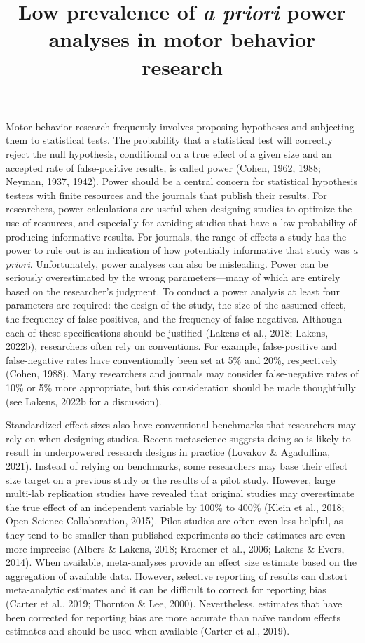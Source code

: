 \documentclass[
  doc, donotrepeattitle,floatsintext]{apa7}
\title{Low prevalence of \emph{a priori} power analyses in motor behavior research}
\author{\phantom{0}}
\date{}
\affiliation{\phantom{0}}
\begin{document}
\maketitle

Motor behavior research frequently involves proposing hypotheses and subjecting them to statistical tests. The probability that a statistical test will correctly reject the null hypothesis, conditional on a true effect of a given size and an accepted rate of false-positive results, is called power (Cohen, 1962, 1988; Neyman, 1937, 1942). Power should be a central concern for statistical hypothesis testers with finite resources and the journals that publish their results. For researchers, power calculations are useful when designing studies to optimize the use of resources, and especially for avoiding studies that have a low probability of producing informative results. For journals, the range of effects a study has the power to rule out is an indication of how potentially informative that study was \emph{a priori}. Unfortunately, power analyses can also be misleading. Power can be seriously overestimated by the wrong parameters---many of which are entirely based on the researcher's judgment. To conduct a power analysis at least four parameters are required: the design of the study, the size of the assumed effect, the frequency of false-positives, and the frequency of false-negatives. Although each of these specifications should be justified (Lakens et al., 2018; Lakens, 2022b), researchers often rely on conventions. For example, false-positive and false-negative rates have conventionally been set at 5\% and 20\%, respectively (Cohen, 1988). Many researchers and journals may consider false-negative rates of 10\% or 5\% more appropriate, but this consideration should be made thoughtfully (see Lakens, 2022b for a discussion).

Standardized effect sizes also have conventional benchmarks that researchers may rely on when designing studies. Recent metascience suggests doing so is likely to result in underpowered research designs in practice (Lovakov \& Agadullina, 2021). Instead of relying on benchmarks, some researchers may base their effect size target on a previous study or the results of a pilot study. However, large multi-lab replication studies have revealed that original studies may overestimate the true effect of an independent variable by 100\% to 400\% (Klein et al., 2018; Open Science Collaboration, 2015). Pilot studies are often even less helpful, as they tend to be smaller than published experiments so their estimates are even more imprecise (Albers \& Lakens, 2018; Kraemer et al., 2006; Lakens \& Evers, 2014). When available, meta-analyses provide an effect size estimate based on the aggregation of available data. However, selective reporting of results can distort meta-analytic estimates and it can be difficult to correct for reporting bias (Carter et al., 2019; Thornton \& Lee, 2000). Nevertheless, estimates that have been corrected for reporting bias are more accurate than naïve random effects estimates and should be used when available (Carter et al., 2019).
\end{document}
